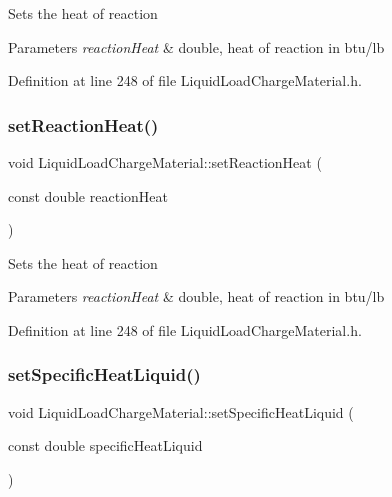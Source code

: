 Sets the heat of reaction 
\begin{DoxyParams}{Parameters}
{\em reaction\+Heat} & double, heat of reaction in btu/lb \\
\hline
\end{DoxyParams}


Definition at line 248 of file Liquid\+Load\+Charge\+Material.\+h.

\mbox{\label{class_liquid_load_charge_material_a793c7ebc2643b2af0eaf21b9cb788775}} 
\subsubsection{\texorpdfstring{set\+Reaction\+Heat()}{setReactionHeat()}\hspace{0.1cm}{\footnotesize\ttfamily [3/3]}}
{\footnotesize\ttfamily void Liquid\+Load\+Charge\+Material\+::set\+Reaction\+Heat (\begin{DoxyParamCaption}\item[{const double}]{reaction\+Heat }\end{DoxyParamCaption})\hspace{0.3cm}{\ttfamily [inline]}}

Sets the heat of reaction 
\begin{DoxyParams}{Parameters}
{\em reaction\+Heat} & double, heat of reaction in btu/lb \\
\hline
\end{DoxyParams}


Definition at line 248 of file Liquid\+Load\+Charge\+Material.\+h.

\mbox{\label{class_liquid_load_charge_material_a2187c4c6ba394c05ab42e769bf175683}} 
\subsubsection{\texorpdfstring{set\+Specific\+Heat\+Liquid()}{setSpecificHeatLiquid()}\hspace{0.1cm}{\footnotesize\ttfamily [1/3]}}
{\footnotesize\ttfamily void Liquid\+Load\+Charge\+Material\+::set\+Specific\+Heat\+Liquid (\begin{DoxyParamCaption}\item[{const double}]{specific\+Heat\+Liquid }\end{DoxyParamCaption})\hspace{0.3cm}{\ttfamily [inline]}}

